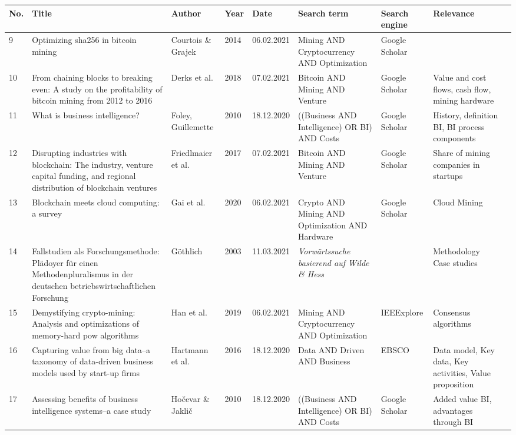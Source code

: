 \begin{table}[H]
	\scriptsize
  	\begin{tabularx}{\textwidth}[ht]{|l|X|X|l|l|X|l|X|X|}
		\hline
		\textbf{No.} & \textbf{Title} & \textbf{Author} & \textbf{Year} & \textbf{Date} & \textbf{Search term} & \textbf{Search engine} & \textbf{Relevance} \\
		\hline\hline
		9 & Optimizing sha256 in bitcoin mining & Courtois \& Grajek & 2014 & 06.02.2021 & Mining AND Cryptocurrency AND Optimization & Google Scholar &  \\
		\hline
		10 & From chaining blocks to breaking even: A study on the profitability of bitcoin mining from 2012 to 2016 & Derks et al. & 2018 & 07.02.2021 & Bitcoin AND Mining AND Venture & Google Scholar & Value and cost flows, cash flow, mining hardware \\
		\hline
		11 & What is business intelligence? & Foley, Guillemette & 2010 & 18.12.2020 & ((Business AND Intelligence) OR BI) AND Costs & Google Scholar & History, definition BI, BI process components \\
		\hline
		12 & Disrupting industries with blockchain: The industry, venture capital funding, and regional distribution of blockchain ventures & Friedlmaier et al. & 2017 & 07.02.2021 & Bitcoin AND Mining AND Venture & Google Scholar & Share of mining companies in startups \\
		\hline
		13 & Blockchain meets cloud computing: a survey & Gai et al. & 2020 & 06.02.2021 & Crypto AND Mining AND Optimization AND Hardware & Google Scholar & Cloud Mining \\
		\hline
		14 & Fallstudien als Forschungsmethode: Pl{\"a}doyer f{\"u}r einen Methodenpluralismus in der deutschen betriebswirtschaftlichen Forschung & Göthlich & 2003 & 11.03.2021 & \textit{Vorwärtssuche basierend auf Wilde \& Hess} &  & Methodology Case studies \\
		\hline
		15 & Demystifying crypto-mining: Analysis and optimizations of memory-hard pow algorithms & Han et al. & 2019 & 06.02.2021 & Mining AND Cryptocurrency AND Optimization & IEEExplore & Consensus algorithms \\
		\hline
		16 & Capturing value from big data--a taxonomy of data-driven business models used by start-up firms & Hartmann et al. & 2016 & 18.12.2020 & Data AND Driven AND Business & EBSCO & Data model, Key data, Key activities, Value proposition \\
		\hline
		17 & Assessing benefits of business intelligence systems--a case study & Ho{\v{c}}evar \& Jakli{\v{c}} & 2010 & 18.12.2020 & ((Business AND Intelligence) OR BI) AND Costs & Google Scholar & Added value BI, advantages through BI \\

\end{tabularx}
\end{table}
